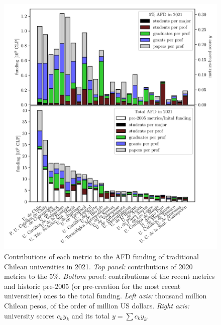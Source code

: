 \documentclass[twocolumn]{article}
\begin{document}
\begin{figure}[p]
\centering
\includegraphics{pdf/afd-coefficients.pdf}
\caption{Contributions of each metric to the AFD funding of traditional Chilean universities in 2021. \textit{Top panel:} contributions of 2020 metrics to the 5\%. \textit{Bottom panel:} contributions of the recent metrics and historic pre-2005 (or pre-creation for the most recent universities) ones to the total funding. \textit{Left axis:} thousand million Chilean pesos, of the order of million US dollars. \textit{Right axis:} university scores $c_k y_k$ and its total $y = \sum c_k y_k$.}
\end{figure}
\end{document}
